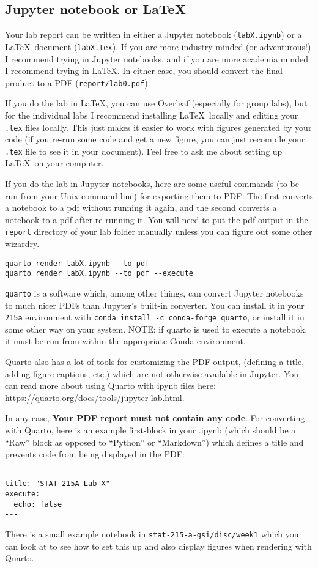 \documentclass[letterpaper,12pt]{article}
\begin{document}
\subsection{Jupyter notebook or LaTeX}

Your lab report can be written in either a Jupyter notebook (\texttt{labX.ipynb}) or a \LaTeX\ document (\texttt{labX.tex}). If you are more industry-minded (or adventurous!) I recommend trying in Jupyter notebooks, and if you are more academia minded I recommend trying in \LaTeX. In either case, you should convert the final product to a PDF (\texttt{report/lab0.pdf}).

If you do the lab in \LaTeX, you can use Overleaf (especially for group labs), but for the individual labs I recommend installing \LaTeX\ locally and editing your \texttt{.tex} files locally. This just makes it easier to work with figures generated by your code (if you re-run some code and get a new figure, you can just recompile your \texttt{.tex} file to see it in your document). Feel free to ask me about setting up \LaTeX\ on your computer.

If you do the lab in Jupyter notebooks, here are some useful commands (to be run from your Unix command-line) for exporting them to PDF. The first converts a notebook to a pdf without running it again, and the second converts a notebook to a pdf after re-running it. You will need to put the pdf output in the \texttt{report} directory of your lab folder manually unless you can figure out some other wizardry.
\begin{verbatim}
quarto render labX.ipynb --to pdf
quarto render labX.ipynb --to pdf --execute
\end{verbatim}
\texttt{quarto} is a software which, among other things, can convert Jupyter notebooks to much nicer PDFs than Jupyter's built-in converter. You can install it in your \texttt{215a} environment with \texttt{conda install -c conda-forge quarto}, or install it in some other way on your system. NOTE: if quarto is used to execute a notebook, it must be run from within the appropriate Conda environment.

Quarto also has a lot of tools for customizing the PDF output, (defining a title, adding figure captions, etc.) which are not otherwise available in Jupyter. You can read more about using Quarto with ipynb files here: https://quarto.org/docs/tools/jupyter-lab.html.

In any case, \textbf{Your PDF report must not contain any code}. For converting with Quarto, here is an example first-block in your .ipynb (which should be a ``Raw'' block as opposed to ``Python'' or ``Markdown'') which defines a title and prevents code from being displayed in the PDF:
\begin{verbatim}
---
title: "STAT 215A Lab X"
execute:
  echo: false
---
\end{verbatim}
There is a small example notebook in \texttt{stat-215-a-gsi/disc/week1} which you can look at to see how to set this up and also display figures when rendering with Quarto.
\end{document}
